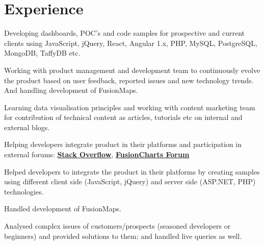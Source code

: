 \documentclass[]{gagan-resume}
\begin{document}
\lastupdated






\begin{minipage}[t]{0.66\textwidth} 



\section{Experience}

\vspace{\topsep} %
\begin{tightemize}
\item Developing dashboards, POC’s and code samples for prospective and current clients using JavaScript, jQuery, React, Angular 1.x, PHP, MySQL, PostgreSQL, MongoDB, TaffyDB etc.
\item Working with product management and development team to continuously evolve the product based on user feedback, reported issues and new technology trends. And handling development of FusionMaps.
\item Learning data visualisation principles and working with content marketing team for contribution of technical content as articles, tutorials etc on internal and external blogs.
\item Helping developers integrate product in their platforms and participation in external forums: \textbf{\href{https://stackoverflow.com/users/4129965/sikrigagan}{Stack Overflow}}, \textbf{\href{http://forum.fusioncharts.com/profile/67674-gagan-sikri/}{FusionCharts Forum}} 
\end{tightemize}
\sectionsep

\begin{tightemize}
\item Helped developers to integrate the product in their platforms by creating samples using different client side (JavaScript, jQuery) and server side (ASP.NET, PHP) technologies.
\item Handled development of FusionMaps.
\item Analysed complex issues of customers/prospects (seasoned developers or beginners) and provided solutions to them; and handled live queries as well.
\end{tightemize}
\sectionsep


\end{minipage}
\end{document}

